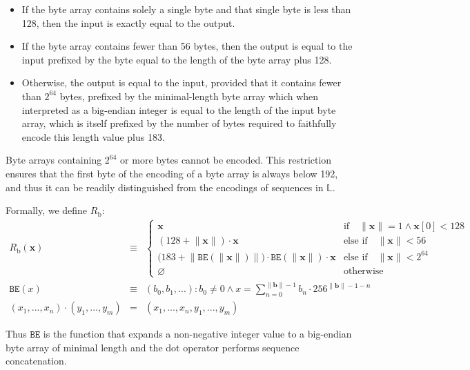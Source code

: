 \documentclass[9pt,oneside]{amsart}
\begin{document}
\begin{itemize}
\item If the byte array contains solely a single byte and that single byte is less than 128, then the input is exactly equal to the output.
\item If the byte array contains fewer than 56 bytes, then the output is equal to the input prefixed by the byte equal to the length of the byte array plus 128.
\item Otherwise, the output is equal to the input, provided that it contains fewer than $2^{64}$ bytes, prefixed by the minimal-length byte array which when interpreted as a big-endian integer is equal to the length of the input byte array, which is itself prefixed by the number of bytes required to faithfully encode this length value plus 183.
\end{itemize}

Byte arrays containing $2^{64}$ or more bytes cannot be encoded. This restriction ensures that the first byte of the encoding of a byte array is always below 192, and thus it can be readily distinguished from the encodings of sequences in $\mathbb{L}$.

\hypertarget{RLP_serialisation_of_a_byte_array_R__b_math_def}{}Formally, we define $R_{\mathrm{b}}$:
\begin{eqnarray}
R_{\mathrm{b}}(\mathbf{x}) & \equiv & \begin{cases}
\mathbf{x} & \text{if} \quad \lVert \mathbf{x} \rVert = 1 \wedge \mathbf{x}[0] < 128 \\
(128 + \lVert \mathbf{x} \rVert) \cdot \mathbf{x} & \text{else if} \quad \lVert \mathbf{x} \rVert < 56 \\
\big(183 + \big\lVert \mathtt{BE}(\lVert \mathbf{x} \rVert) \big\rVert \big) \cdot \mathtt{BE}(\lVert \mathbf{x} \rVert) \cdot \mathbf{x} & \text{else if} \quad \lVert \mathbf{x} \rVert < 2^{64} \\
\varnothing & \text{otherwise}
\end{cases} \\
\label{eq:BE}
\mathtt{BE}(x) & \equiv & (b_0, b_1, ...): b_0 \neq 0 \wedge x = \sum_{n = 0}^{\lVert \mathbf{b} \rVert - 1} b_n \cdot 256^{\lVert \mathbf{b} \rVert - 1 - n} \\
(x_1, ..., x_n) \cdot (y_1, ..., y_m) & = & (x_1, ..., x_n, y_1, ..., y_m)
\end{eqnarray}

Thus $\mathtt{BE}$ is the function that expands a non-negative integer value to a big-endian byte array of minimal length and the dot operator performs sequence concatenation.
\end{document}
